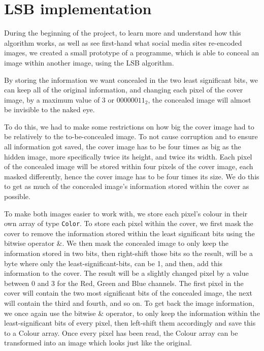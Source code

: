 \section{LSB implementation}
\label{sec:lsb-implementation}
During the beginning of the project, to learn more and understand how this algorithm works, as well as see first-hand what social media sites re-encoded images, we created a small prototype of a programme, which is able to conceal an image within another image, using the LSB algorithm. 

By storing the information we want concealed in the two least significant bits, we can keep all of the original information, and changing each pixel of the cover image, by a maximum value of 3 or $00000011_2$, the concealed image will almost be invisible to the naked eye.

To do this, we had to make some restrictions on how big the cover image had to be relatively to the to-be-concealed image. 
To not cause corruption and to ensure all information got saved, the cover image has to be four times as big as the hidden image, more specifically twice its height, and twice its width. 
Each pixel of the concealed image will be stored within four pixels of the cover image, each masked differently, hence the cover image has to be four times its size. 
We do this to get as much of the concealed image's information stored within the cover as possible.

To make both images easier to work with, we store each pixel's colour in their own array of type \lstinline|Color|.
To store each pixel within the cover, we first mask the cover to remove the information stored within the least significant bits using the bitwise operator \&. 
We then mask the concealed image to only keep the information stored in two bits, then right-shift those bits so the result, will be a byte where only the least-significant-bits, can be 1, and then, add this information to the cover. 
The result will be a slightly changed pixel by a value between 0 and 3 for the Red, Green and Blue channels. 
The first pixel in the cover will contain the two most significant bits of the concealed image, the next will contain the third and fourth, and so on. 
To get back the image information, we once again use the bitwise \& operator, to only keep the information within the least-significant bits of every pixel, then left-shift them accordingly and save this to a Colour array. Once every pixel has been read, the Colour array can be transformed into an image which looks just like the original.

